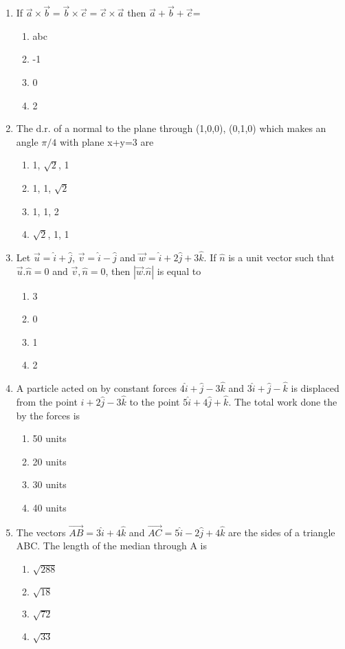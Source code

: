 \begin{enumerate}[label=\arabic*.,ref=\thesubsection.\theenumi]
\item If $\overrightarrow{a} \times \overrightarrow{b} = \overrightarrow{b} \times \overrightarrow{c} = \overrightarrow{c} \times \overrightarrow{a}$ then $\overrightarrow{a}+\overrightarrow{b}+\overrightarrow{c}$=
\begin{enumerate}
\item abc
\item -1
\item 0
\item 2
\end{enumerate}

\item The d.r. of a normal to the plane through (1,0,0), (0,1,0) which makes an angle $\pi/4$ with plane x+y=3 are
\begin{enumerate}
\item 1, $\sqrt{2}$, 1
\item 1, 1, $\sqrt{2}$
\item 1, 1, 2
\item $\sqrt{2}$, 1, 1
\end{enumerate}

\item Let $\overrightarrow{u}=\hat{i}+\hat{j}$, $\overrightarrow{v}=\hat{i}-\hat{j}$ and $\overrightarrow{w}=\hat{i}+2\hat{j}+3\hat{k}$. If $\hat{n}$ is a unit vector such that $\overrightarrow{u}.\hat{n}=0$ and $\overrightarrow{v},\hat{n}=0$, then $|\overrightarrow{w}.\hat{n}|$ is equal to
\begin{enumerate}
\item 3
\item 0
\item 1
\item 2
\end{enumerate}

\item A particle acted on by constant forces $4\hat{i}+\hat{j}-3\hat{k}$ and $3\hat{i}+\hat{j}-\hat{k}$ is displaced from the point $\hat{i}+2\hat{j}-3\hat{k}$ to the point $5\hat{i}+4\hat{j}+\hat{k}$. The total work done the by the forces is
\begin{enumerate}
\item 50 units
\item 20 units
\item 30 units
\item 40 units
\end{enumerate}

\item The vectors $\overrightarrow{AB}=3\hat{i}+4\hat{k}$ and $\overrightarrow{AC}=5\hat{i}-2\hat{j}+4\hat{k}$ are the sides of a triangle ABC. The length of the median through A is
\begin{enumerate}
\item $\sqrt{288}$
\item $\sqrt{18}$
\item $\sqrt{72}$
\item $\sqrt{33}$
\end{enumerate}


\end{enumerate}
